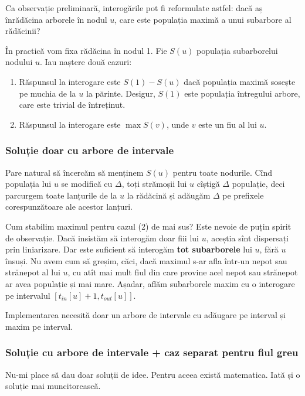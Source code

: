 \documentclass[../main.tex]{subfiles}
\begin{document}
Ca observație preliminară, interogările pot fi reformulate astfel: dacă aș înrădăcina arborele în nodul $u$, care este populația maximă a unui subarbore al rădăcinii?

În practică vom fixa rădăcina în nodul 1. Fie $S(u)$ populația subarborelui nodului $u$. Iau naștere două cazuri:

\begin{enumerate}
  \item Răspunsul la interogare este $S(1) - S(u)$ dacă populația maximă sosește pe muchia de la $u$ la părinte. Desigur, $S(1)$ este populația întregului arbore, care este trivial de întreținut.
  \item Răspunsul la interogare este $\max S(v)$, unde $v$ este un fiu al lui $u$.
\end{enumerate}

\subsubsection*{Soluție doar cu arbore de intervale}

Pare natural să încercăm să menținem $S(u)$ pentru toate nodurile. Cînd populația lui $u$ se modifică cu $\Delta$, toți strămoșii lui $u$ cîștigă $\Delta$ populație, deci parcurgem toate lanțurile de la $u$ la rădăcină și adăugăm $\Delta$ pe prefixele corespunzătoare ale acestor lanțuri.

Cum stabilim maximul pentru cazul (2) de mai sus? Este nevoie de puțin spirit de observație. Dacă insistăm să interogăm doar fiii lui $u$, aceștia sînt dispersați prin liniarizare. Dar este suficient să interogăm \textbf{tot subarborele} lui $u$, fără $u$ însuși. Nu avem cum să greșim, căci, dacă maximul s-ar afla într-un nepot sau strănepot al lui $u$, cu atît mai mult fiul din care provine acel nepot sau strănepot ar avea populație și mai mare. Așadar, aflăm subarborele maxim cu o interogare pe intervalul $[t_{in}[u] + 1, t_{out}[u]]$.

Implementarea necesită doar un arbore de intervale cu adăugare pe interval și maxim pe interval.

\subsubsection*{Soluție cu arbore de intervale + caz separat pentru fiul greu}

Nu-mi place să dau doar soluții de idee. Pentru aceea există matematica.  Iată și o soluție mai muncitorească.
\end{document}
